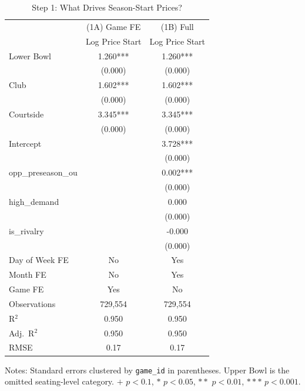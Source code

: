 \documentclass[12pt]{article}
\begin{document}
\begin{table}[h!]
\centering
\caption{Step 1: What Drives Season-Start Prices?}
\begin{tabular}{lcc}
\toprule
 & (1A) Game FE & (1B) Full \\
 & Log Price Start & Log Price Start \\
\midrule
Lower Bowl & 1.260*** & 1.260*** \\
           & (0.000)  & (0.000)  \\
Club       & 1.602*** & 1.602*** \\
           & (0.000)  & (0.000)  \\
Courtside  & 3.345*** & 3.345*** \\
           & (0.000)  & (0.000)  \\
Intercept  &          & 3.728*** \\
           &          & (0.000)  \\
opp\_preseason\_ou &   & 0.002*** \\
           &          & (0.000)  \\
high\_demand &         & 0.000    \\
           &          & (0.000)  \\
is\_rivalry &          & -0.000   \\
           &          & (0.000)  \\
Day of Week FE & No   & Yes      \\
Month FE   & No       & Yes      \\
Game FE    & Yes      & No       \\
\midrule
Observations & 729,554 & 729,554 \\
R$^2$      & 0.950    & 0.950    \\
Adj.\ R$^2$ & 0.950   & 0.950    \\
RMSE       & 0.17     & 0.17     \\
\bottomrule
\end{tabular}
\begin{tablenotes}
\small
\item Notes: Standard errors clustered by \texttt{game\_id} in parentheses. 
Upper Bowl is the omitted seating-level category. 
$+$ $p < 0.1$, $*$ $p < 0.05$, $**$ $p < 0.01$, $***$ $p < 0.001$.
\end{tablenotes}
\end{table}
 
\end{document}
